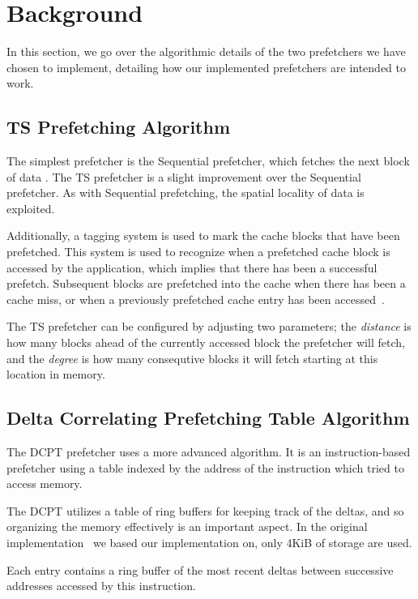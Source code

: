 \section{Background}

In this section, we go over the algorithmic details of the two prefetchers we
have chosen to implement, detailing how our implemented prefetchers are intended
to work.

\subsection{TS Prefetching Algorithm}

The simplest prefetcher is the Sequential prefetcher, which fetches the next
block of data \cite{seq}. The TS prefetcher is a slight improvement over the
Sequential prefetcher. As with Sequential prefetching, the spatial locality of
data is exploited.

Additionally, a tagging system is used to mark the cache blocks that have been
prefetched. This system is used to recognize when a prefetched cache block is
accessed by the application, which implies that there has been a successful
prefetch. Subsequent blocks are prefetched into the cache when there has been a
cache miss, or when a previously prefetched cache entry has been
accessed~\cite{grannaes}.

The TS prefetcher can be configured by adjusting two parameters; the
\emph{distance} is how many blocks ahead of the currently accessed block the
prefetcher will fetch, and the \emph{degree} is how many consequtive blocks it
will fetch starting at this location in memory.

\subsection{Delta Correlating Prefetching Table Algorithm}

The DCPT prefetcher uses a more advanced algorithm. It is an instruction-based
prefetcher using a table indexed by the address of the instruction which tried
to access memory.

The DCPT utilizes a table of ring buffers for keeping track of the deltas, and
so organizing the memory effectively is an important aspect. In the original
implementation~\cite{dcpt} we based our implementation on, only 4KiB of storage
are used.

Each entry contains a ring buffer of the most recent deltas between successive
addresses accessed by this instruction.

